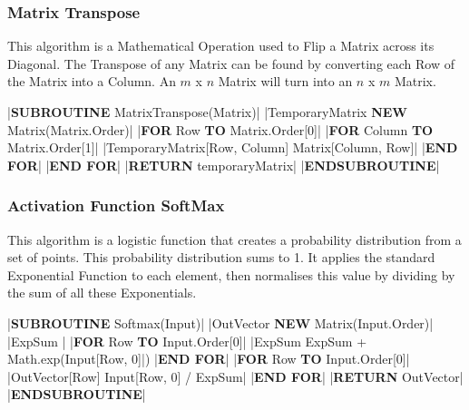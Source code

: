\begin{flushleft}
            \subsubsection{Matrix Transpose}
                This algorithm is a Mathematical Operation used to Flip a Matrix across its Diagonal. The Transpose of any Matrix
                can be found by converting each Row of the Matrix into a Column. An $m$ x $n$ Matrix will turn into an $n$ x $m$ Matrix.

                \vspace{0.2cm}
                \begin{pseudocode}
|\textbf{SUBROUTINE} MatrixTranspose(Matrix)|
    |TemporaryMatrix \leftarrow \textbf{NEW} Matrix(Matrix.Order)|
    |\textbf{FOR} Row  \textbf{TO} Matrix.Order[0]|
        |\textbf{FOR} Column  \textbf{TO} Matrix.Order[1]|
            |TemporaryMatrix[Row, Column] \leftarrow Matrix[Column, Row]|
        |\textbf{END FOR}|
    |\textbf{END FOR}|
    |\textbf{RETURN} temporaryMatrix|
|\textbf{ENDSUBROUTINE}|
                \end{pseudocode}

                \vspace{0.5cm}
            \subsubsection{Activation Function SoftMax}
                This algorithm is a logistic function that creates a probability distribution from a set of points. This probability 
                distribution sums to 1. It applies the standard Exponential Function to each element, then normalises this value by dividing
                by the sum of all these Exponentials.

                \vspace{0.2cm}
                \begin{pseudocode}
|\textbf{SUBROUTINE} Softmax(Input)|
    |OutVector \leftarrow \textbf{NEW} Matrix(Input.Order)|
    |ExpSum |
    |\textbf{FOR} Row  \textbf{TO} Input.Order[0]|
        |ExpSum \leftarrow ExpSum + Math.exp(Input[Row, 0]|)
    |\textbf{END FOR}|
    |\textbf{FOR} Row  \textbf{TO} Input.Order[0]|
        |OutVector[Row] \leftarrow Input[Row, 0] / ExpSum|
    |\textbf{END FOR}|
    |\textbf{RETURN} OutVector|
|\textbf{ENDSUBROUTINE}|
                \end{pseudocode}

                \vspace{0.5cm}

\end{flushleft}
